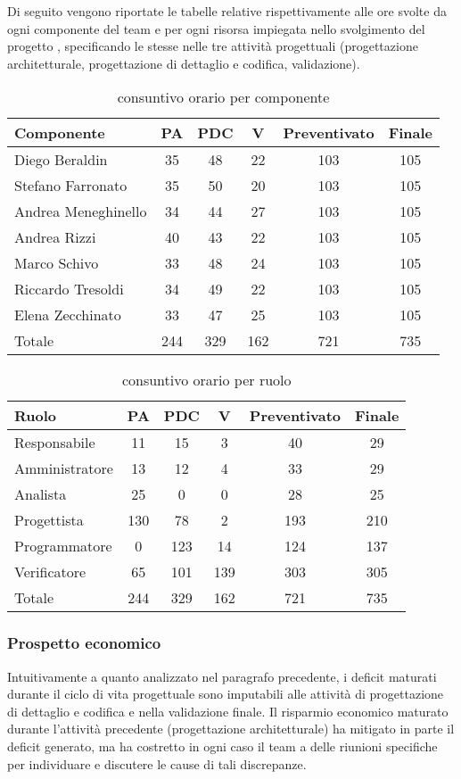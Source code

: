 Di seguito vengono riportate le tabelle relative rispettivamente alle ore svolte da ogni componente del team e per ogni risorsa impiegata nello svolgimento del progetto \caName, specificando le stesse nelle tre attività progettuali (progettazione architetturale, progettazione di dettaglio e codifica, validazione).

\begin{table}[H]
\centering
\begin{tabular}{|l|c|c|c|c|c|}
\hline
Componente& PA& PDC& V& Preventivato& Finale\\
\hline
Diego Beraldin & 35& 48& 22&103&105\\
Stefano Farronato & 35& 50& 20&103&105\\
Andrea Meneghinello & 34& 44& 27&103&105\\
Andrea Rizzi & 40& 43& 22&103&105\\
Marco Schivo & 33& 48& 24&103&105\\
Riccardo Tresoldi & 34& 49& 22&103&105\\
Elena Zecchinato & 33& 47& 25&103&105\\
\hline
Totale&244&329&162&721&735\\
\hline
\end{tabular}
\caption{consuntivo orario per componente}\label{tab:conscomponente}
\end{table}

\begin{table}[H]
\centering
\begin{tabular}{|l|c|c|c|c|c|}
\hline
Ruolo& PA& PDC& V&Preventivato& Finale \\
\hline
Responsabile &11 & 15&3 &40&29 \\
Amministratore &13 & 12&4 &33&29\\
Analista &25 &0 & 0&28&25\\
Progettista &130 & 78&2 &193&210\\
Programmatore & 0& 123&14&124 &137\\
Verificatore & 65& 101&139&303 &305\\
\hline
Totale&244&329&162&721&735\\
\hline
\end{tabular}
\caption{consuntivo orario per ruolo}\label{tab:consruolo}
\end{table}


\subsubsection{Prospetto economico}
Intuitivamente a quanto analizzato nel paragrafo precedente, i deficit maturati durante il ciclo di vita progettuale sono imputabili alle attività di progettazione di dettaglio e codifica e nella validazione finale. Il risparmio economico maturato durante l'attività precedente (progettazione architetturale) ha mitigato in parte il deficit generato, ma ha costretto in ogni caso il team a delle riunioni specifiche per individuare e discutere le cause di tali discrepanze.

